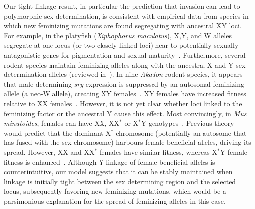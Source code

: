\documentclass[10pt,letterpaper]{article}
\begin{document}
Our tight linkage result, in particular the prediction that invasion can lead to polymorphic sex determination, is consistent with empirical data from species in which new feminizing mutations are found segregating with ancestral XY loci.
For example, in the platyfish (\textit{Xiphophorus maculatus}), X,Y, and W alleles segregate at one locus (or two closely-linked loci) near to potentially sexually-antagonistic genes for pigmentation and sexual maturity~\cite{Kallman1965,Kallman1968, Volff2001, Schultheis2006}.
Furthermore, several rodent species maintain feminizing alleles along with the ancestral X and Y sex-determination alleles (reviewed in~\cite{Fredga1994}). 
In nine \textit{Akadon} rodent species, it appears that male-determining-\textit{sry} expression is suppressed by an autosomal feminizing allele (a neo-W allele), creating XY females~\cite{Bianchi2002,Sanchez2010}. 
XY females have increased fitness relative to XX females~\cite{Hoekstra2001}. 
However, it is not yet clear whether loci linked to the feminizing factor or the ancestral Y cause this effect. 
Most convincingly, in \textit{Mus minutoides}, females can have XX, XX$^\ast$ or X$^\ast$Y genotypes~\cite{Veyrunes2010}. 
Previous theory would predict that the dominant X$^\ast$ chromosome (potentially an autosome that has fused with the sex chromosome) harbours female beneficial alleles, driving its spread. 
However, XX and XX$^\ast$ females have similar fitness, whereas X$^\ast$Y female fitness is enhanced~\cite{Saunders2014,Saunders2016, Veyrunes2017}. 
Although Y-linkage of female-beneficial alleles is counterintuitive, our model suggests that it can be stably maintained when linkage is initially tight between the sex determining region and the selected locus, subsequently favoring new feminizing mutations, which would be a parsimonious explanation for the spread of feminizing alleles in this case. 
\end{document}
